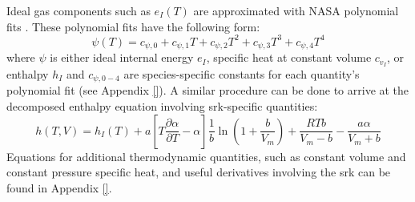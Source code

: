Ideal gas components such as $e_I(T)$ are approximated with NASA polynomial fits \cite{}. These polynomial fits have the following form:
\begin{equation} \label{NASA_poly}
\psi(T) = c_{\psi, 0} + c_{\psi, 1}T + c_{\psi, 2}T^2 + c_{\psi, 3}T^3 + c_{\psi, 4}T^4  
\end{equation}
where $\psi$ is either ideal internal energy $e_I$, specific heat at constant volume $c_{v_I}$, or enthalpy $h_I$ and $c_{\psi,0-4}$ are species-specific constants for each quantity's polynomial fit (see Appendix \ref{}). A similar procedure can be done to arrive at the decomposed enthalpy equation involving \gls{srk}-specific quantities:
\begin{equation} \label{thermo_enthalpy}
h(T,V) = h_I(T) +  a \left[ T \dfrac{\partial \alpha}{\partial T} - \alpha \right] \dfrac{1}{b}\ln\left( 1 + \dfrac{b}{V_m} \right) + \dfrac{RTb}{V_m - b} - \dfrac{a \alpha}{V_m + b}
\end{equation}
Equations for additional thermodynamic quantities, such as constant volume and constant pressure specific heat, and useful derivatives involving the \gls{srk} can be found in Appendix \ref{}. 

